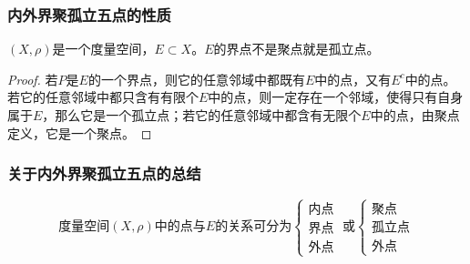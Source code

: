 \subsubsection{内外界聚孤立五点的性质}
\begin{theorem}
	$(X,\rho)$是一个度量空间，$E\subset X$。$E$的界点不是聚点就是孤立点。
\end{theorem}
\begin{proof}
	若$P$是$E$的一个界点，则它的任意邻域中都既有$E$中的点，又有$E^c$中的点。若它的任意邻域中都只含有有限个$E$中的点，则一定存在一个邻域，使得只有自身属于$E$，那么它是一个孤立点；若它的任意邻域中都含有无限个$E$中的点，由聚点定义，它是一个聚点。
\end{proof}
\subsubsection{关于内外界聚孤立五点的总结}
\begin{equation*}
	\text{度量空间}(X,\rho)\text{中的点与$E$的关系可分为}
	\begin{cases}
		\text{内点} \\
		\text{界点} \\
		\text{外点}    
	\end{cases}\;\text{或}
	\begin{cases}
		\text{聚点}   \\
		\text{孤立点} \\
		\text{外点}    
	\end{cases}
\end{equation*}
